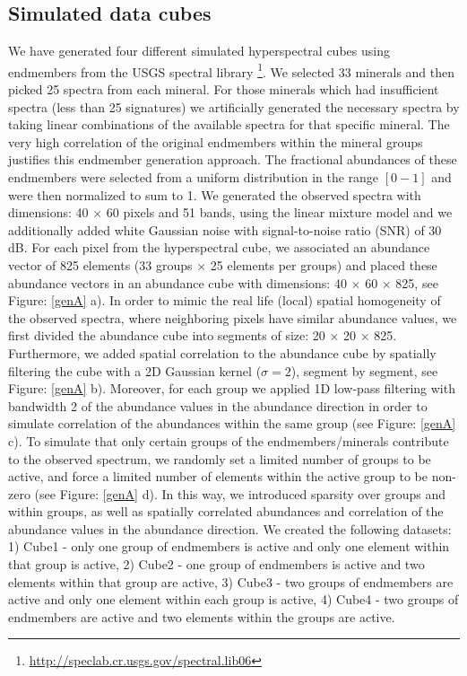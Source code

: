 \documentclass{article}
\begin{document}
\subsection{Simulated data cubes}
We have generated four different simulated hyperspectral cubes using endmembers from the USGS spectral library \footnote{\href {http://speclab.cr.usgs.gov/spectral.lib06}{http://speclab.cr.usgs.gov/spectral.lib06}}. We selected 33 minerals and then picked 25 spectra from each mineral. For those minerals which had insufficient spectra (less than 25 signatures) we artificially generated the necessary spectra by taking linear combinations of the available spectra for that specific mineral. The very high correlation of the original endmembers within the mineral groups justifies this endmember generation approach. The fractional abundances of these endmembers were selected from a uniform distribution in the range $[0-1]$ and were then normalized to sum to 1. We generated the observed spectra with dimensions: 40 $\times$ 60 pixels and 51 bands, using the linear mixture model and we additionally added white Gaussian noise with signal-to-noise ratio (SNR) of 30 dB. For each pixel from the hyperspectral cube, we associated an abundance vector of 825 elements (33 groups $\times$ 25 elements per groups) and placed these abundance vectors in an abundance cube with dimensions: 40 $\times$ 60 $\times$ 825, see Figure: \ref{genA} a).
In order to mimic the real life (local) spatial homogeneity of the observed spectra, where neighboring pixels have similar abundance values, we first divided the abundance cube into segments of size: 20 $\times$ 20 $\times$ 825.  Furthermore, we added spatial correlation to the abundance cube by 
spatially filtering the cube with a 2D Gaussian kernel ($\sigma = 2$), segment by segment, see Figure: \ref{genA} b). 
Moreover, for each group we applied 1D low-pass filtering with bandwidth 2 of the abundance values in the abundance direction %
in order to simulate correlation of the abundances within the same group (see Figure: \ref{genA} c). To simulate that only certain groups of the endmembers/minerals contribute to the observed spectrum, we randomly set a limited number of groups to be active, and force a limited number of elements within the active group to be non-zero (see Figure: \ref{genA} d). In this way, we introduced sparsity over groups and within groups, as well as spatially correlated abundances and correlation of the abundance values in the abundance direction.
We created the following datasets: 1) Cube1 - only one group of endmembers is active and only one element within that group is active, 2) Cube2 - one group of endmembers is active and two elements within that group are active, 3) Cube3 - two groups of endmembers are active and only one element within each group is active, 4) Cube4 - two groups of endmembers are active and two elements within the groups are active. 
\end{document}
